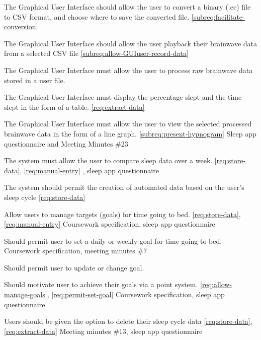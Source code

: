 {The Graphical User Interface should allow the user to convert a binary (.ec) file to CSV format,
  and choose where to save the converted file.}
{\phigh}
{\ref{subreq:facilitate-conversion}}
{}

{The Graphical User Interface should allow the user playback their brainwave data from a selected CSV file}
{\phigh}
{\ref{subreq:allow-GUIuser-record-data}}
{}

{The Graphical User Interface must allow the user to process raw brainwave data stored in a user file.}
{\phigh}
{\dnone}
{}

{The Graphical User Interface must display the percentage slept and the time slept in the form of a table.}
{\phigh}
{\ref{req:extract-data}}
{}

{The Graphical User Interface must allow the user to view the selected processed brainwave data in
  the form of a line graph.}
{\phigh}
{\ref{subreq:present-hypnogram}}
{Sleep app questionnaire and Meeting Minutes \#23}


{The system must allow the user to compare sleep data over a week.}
{\phigh}
{\ref{req:store-data}, \ref{req:manual-entry}}
{\textcite{British-Medical-Association:2018aa}, sleep app questionnaire}

{The system should permit the creation of automated data based on the user's sleep cycle}
{\pmed}
{\ref{req:store-data}}
{}


{Allow users to manage targets (goals) for time going to bed.}
{\pmed}
{\ref{req:store-data}, \ref{req:manual-entry}}
{Coursework specification, sleep app questionnaire}

{Should permit user to set a daily or weekly goal for time going to bed.}
{\pmed}
{\dnone}
{Coursework specification, meeting minutes \#7}

{Should permit user to update or change goal.}
{\pmed}
{\dnone}
{\sspec}

{Should motivate user to achieve their goals via a point system.}
{\pmed}
{\ref{req:allow-manage-goals}, \ref{req:permit-set-goal}}
{Coursework specification, sleep app questionnaire}


{Users should be given the option to delete their sleep cycle data}
{\plow}
{\ref{req:store-data}, \ref{req:extract-data}}
{Meeting minutes \#13, sleep app questionnaire}
